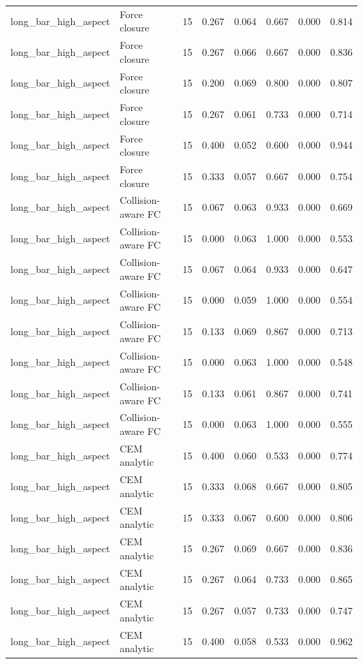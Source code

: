 {\begin{longtable}{llrrrrrr}
long\_bar\_high\_aspect & Force closure & 15 & 0.267 & 0.064 & 0.667 & 0.000 & 0.814 \\
long\_bar\_high\_aspect & Force closure & 15 & 0.267 & 0.066 & 0.667 & 0.000 & 0.836 \\
long\_bar\_high\_aspect & Force closure & 15 & 0.200 & 0.069 & 0.800 & 0.000 & 0.807 \\
long\_bar\_high\_aspect & Force closure & 15 & 0.267 & 0.061 & 0.733 & 0.000 & 0.714 \\
long\_bar\_high\_aspect & Force closure & 15 & 0.400 & 0.052 & 0.600 & 0.000 & 0.944 \\
long\_bar\_high\_aspect & Force closure & 15 & 0.333 & 0.057 & 0.667 & 0.000 & 0.754 \\
long\_bar\_high\_aspect & Collision-aware FC & 15 & 0.067 & 0.063 & 0.933 & 0.000 & 0.669 \\
long\_bar\_high\_aspect & Collision-aware FC & 15 & 0.000 & 0.063 & 1.000 & 0.000 & 0.553 \\
long\_bar\_high\_aspect & Collision-aware FC & 15 & 0.067 & 0.064 & 0.933 & 0.000 & 0.647 \\
long\_bar\_high\_aspect & Collision-aware FC & 15 & 0.000 & 0.059 & 1.000 & 0.000 & 0.554 \\
long\_bar\_high\_aspect & Collision-aware FC & 15 & 0.133 & 0.069 & 0.867 & 0.000 & 0.713 \\
long\_bar\_high\_aspect & Collision-aware FC & 15 & 0.000 & 0.063 & 1.000 & 0.000 & 0.548 \\
long\_bar\_high\_aspect & Collision-aware FC & 15 & 0.133 & 0.061 & 0.867 & 0.000 & 0.741 \\
long\_bar\_high\_aspect & Collision-aware FC & 15 & 0.000 & 0.063 & 1.000 & 0.000 & 0.555 \\
long\_bar\_high\_aspect & CEM analytic & 15 & 0.400 & 0.060 & 0.533 & 0.000 & 0.774 \\
long\_bar\_high\_aspect & CEM analytic & 15 & 0.333 & 0.068 & 0.667 & 0.000 & 0.805 \\
long\_bar\_high\_aspect & CEM analytic & 15 & 0.333 & 0.067 & 0.600 & 0.000 & 0.806 \\
long\_bar\_high\_aspect & CEM analytic & 15 & 0.267 & 0.069 & 0.667 & 0.000 & 0.836 \\
long\_bar\_high\_aspect & CEM analytic & 15 & 0.267 & 0.064 & 0.733 & 0.000 & 0.865 \\
long\_bar\_high\_aspect & CEM analytic & 15 & 0.267 & 0.057 & 0.733 & 0.000 & 0.747 \\
long\_bar\_high\_aspect & CEM analytic & 15 & 0.400 & 0.058 & 0.533 & 0.000 & 0.962 \\

\end{longtable}}
